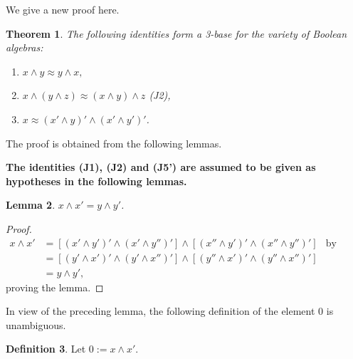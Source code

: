 \documentclass{amsart}
\theoremstyle{plain}
\newtheorem{theorem}{Theorem}[section]
\newtheorem{lemma}[theorem]{Lemma}
\theoremstyle{problem}
\theoremstyle{definition}
\newtheorem{definition}[theorem]{Definition}
\theoremstyle{remark}
\numberwithin{equation}{section}
\begin{document}
 We give a new proof here.
\begin{theorem} \label{T9.1}
    The following identities form a 3-base for the variety of Boolean algebras:
\begin{enumerate}
   \item[{\rm(J1)}] $x \land y \approx y \land x,$
   \item[{\rm(A1)}] ${x \land ( y \land z )\approx (x \land y) \land z}$ \quad (J2),
   \item[{\rm(J5')}] ${x \approx (x' \land y)' \land (x' \land y')'}$.
\end{enumerate}
\end{theorem}
    The proof is obtained from the following lemmas.  
    
    {\bf The identities (J1), (J2) and (J5') are assumed to be given as hypotheses in the following lemmas.}

\begin{lemma} \label{92}
    $x \land x'= y \land y'$.
\end{lemma}
\begin{proof}
\begin{align*}
    x \land x' 
         &=[(x' \land y')' \land (x' \land y'')'] \land [(x'' \land y')' \land (x'' \land y'')']
                        &\text{by (J5')}\\
               &=[(y' \land x')' \land (y' \land x'')'] \land [(y'' \land x')' \land (y'' \land x'')']\\
               &=y \land y',
\end{align*}
proving the lemma.
\end{proof}

In view of the preceding lemma, the following definition of the element $0$ is unambiguous.
\begin{definition} \label{93}
    Let $0 := x \land x'$.
\end{definition}

\end{document}
